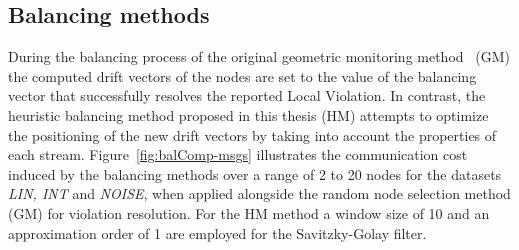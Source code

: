 \subsection{Balancing methods} \label{subsec:balComp}

During the balancing process of the original geometric monitoring method~\cite{Sharfman2006GM} (GM) the computed drift vectors of the nodes are set to the value of the balancing vector that successfully resolves the reported Local Violation. In contrast, the heuristic balancing method proposed in this thesis (HM) attempts to optimize the positioning of the new drift vectors by taking into account the properties of each stream. Figure~\ref{fig:balComp-msgs} illustrates the communication cost induced by the balancing methods over a range of 2 to 20 nodes for the datasets \emph{LIN, INT} and \emph{NOISE}, when applied alongside the random node selection method (GM) for violation resolution. For the HM method a window size of 10 and an approximation order of 1 are employed for the Savitzky-Golay filter.

